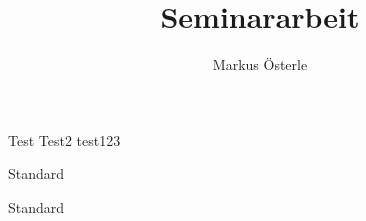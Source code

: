 \documentclass[12pt,a4paper]{report}
\author{Markus Österle}
\title{Seminararbeit}
\begin{document}
\maketitle
\tableofcontents
Test \cite{ta1}
Test2 \cite{ta2}
test123


Standard


\textsf{Standard}

\printbibliography 
\end{document}
